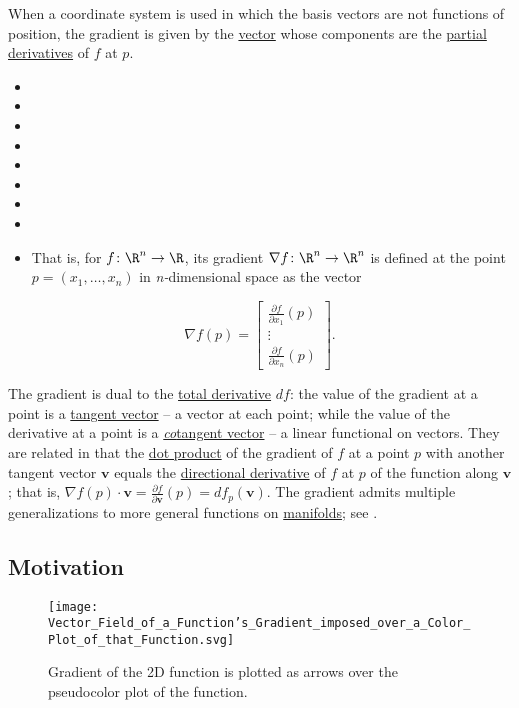 \documentclass[
]{article}
\begin{document}
When a coordinate system is used in which the basis vectors are not
functions of position, the gradient is given by the
\href{Vector_(mathematics_and_physics)}{vector} whose components are the
\href{partial_derivative}{partial derivatives} of \(f\) at \(p\).

\begin{itemize}
\item
\item
\item
\item
\item
\item
\item
\item
\item
  That is, for \(f \colon \R^n \to \R\), its gradient
  \(\nabla f \colon \R^n \to \R^n\) is defined at the point
  \(p = (x_1,\ldots,x_n)\) in \emph{n-}dimensional space as the vector
\end{itemize}

\[\nabla f(p) = \begin{bmatrix}
 \frac{\partial f}{\partial x_1}(p) \\
 \vdots \\
 \frac{\partial f}{\partial x_n}(p)
\end{bmatrix}.\]

The gradient is dual to the \href{total_derivative}{total derivative}
\(df\): the value of the gradient at a point is a
\href{tangent_vector}{tangent vector} -- a vector at each point; while
the value of the derivative at a point is a
\href{cotangent_vector}{\emph{co}tangent vector} -- a linear functional
on vectors. They are related in that the \href{dot_product}{dot product}
of the gradient of \(f\) at a point \(p\) with another tangent vector
\(\mathbf{v}\) equals the \href{directional_derivative}{directional
derivative} of \(f\) at \(p\) of the function along \(\mathbf{v}\); that
is,
\(\nabla f(p) \cdot \mathbf v = \frac{\partial f}{\partial\mathbf{v}}(p) = df_{p}(\mathbf{v})\).
The gradient admits multiple generalizations to more general functions
on \href{manifold}{manifolds}; see .

\hypertarget{motivation}{%
\subsection{Motivation}\label{motivation}}

\begin{figure}
\centering
\texttt{[image: Vector\_Field\_of\_a\_Function's\_Gradient\_imposed\_over\_a\_Color\_Plot\_of\_that\_Function.svg]}
\caption{Gradient of the 2D function is plotted as arrows over the
pseudocolor plot of the function.}
\end{figure}
\end{document}
